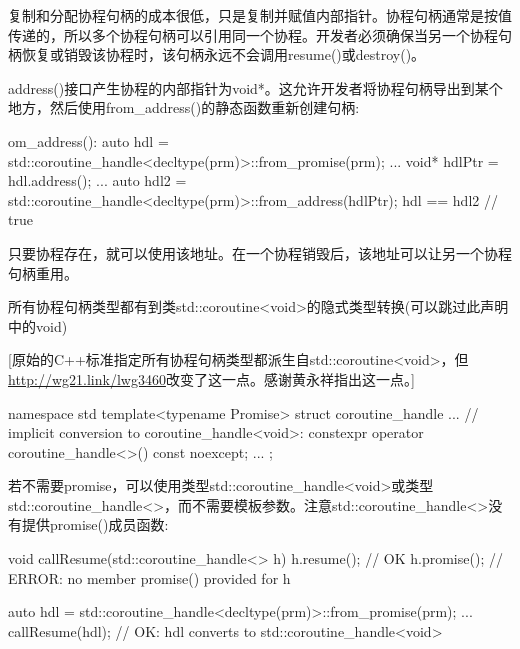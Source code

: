 复制和分配协程句柄的成本很低，只是复制并赋值内部指针。协程句柄通常是按值传递的，所以多个协程句柄可以引用同一个协程。开发者必须确保当另一个协程句柄恢复或销毁该协程时，该句柄永远不会调用resume()或destroy()。

address()接口产生协程的内部指针为void*。这允许开发者将协程句柄导出到某个地方，然后使用from\_address()的静态函数重新创建句柄:

\begin{cpp}
om_address():
auto hdl = std::coroutine_handle<decltype(prm)>::from_promise(prm);
...
void* hdlPtr = hdl.address();
...
auto hdl2 = std::coroutine_handle<decltype(prm)>::from_address(hdlPtr);
hdl == hdl2 // true
\end{cpp}

只要协程存在，就可以使用该地址。在一个协程销毁后，该地址可以让另一个协程句柄重用。


所有协程句柄类型都有到类std::coroutine<void>的隐式类型转换(可以跳过此声明中的void)

[原始的C++标准指定所有协程句柄类型都派生自std::coroutine<void>，但\url{http://wg21.link/lwg3460}改变了这一点。感谢黄永祥指出这一点。]

\begin{cpp}
namespace std {
	template<typename Promise>
	struct coroutine_handle {
		...
		// implicit conversion to coroutine_handle<void>:
		constexpr operator coroutine_handle<>() const noexcept;
		...
	};
}
\end{cpp}

若不需要promise，可以使用类型std::coroutine\_handle<void>或类型std::coroutine\_handle<>，而不需要模板参数。注意std::coroutine\_handle<>没有提供promise()成员函数:

\begin{cpp}
void callResume(std::coroutine_handle<> h)
{
	h.resume(); // OK
	h.promise(); // ERROR: no member promise() provided for h
}

auto hdl = std::coroutine_handle<decltype(prm)>::from_promise(prm);
...
callResume(hdl); // OK: hdl converts to std::coroutine_handle<void>
\end{cpp}









